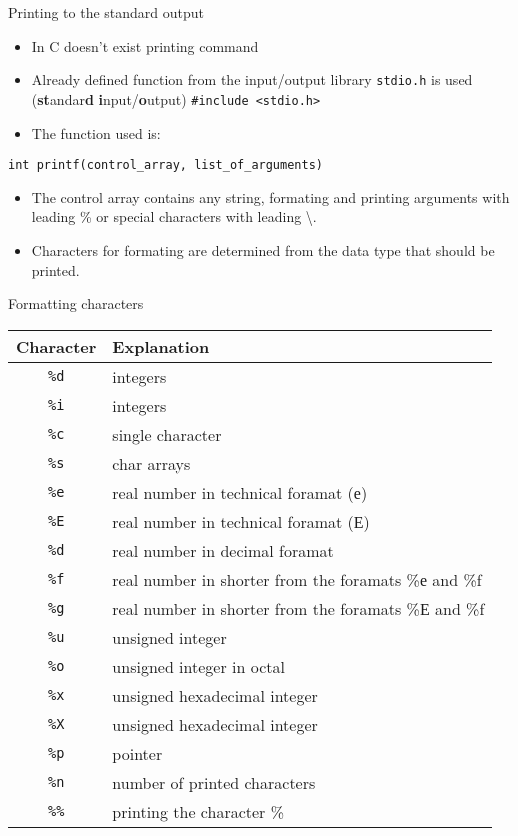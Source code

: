 \begin{frame}[fragile]{Printing to the standard output}
\begin{itemize}
\item In C doesn't exist printing command
\item Already defined function from the input/output library \texttt{stdio.h} is
used (\textbf{st}andar\textbf{d} \textbf{i}nput/\textbf{o}utput)
\large{\texttt{\#include <stdio.h>}}
\item The function used is:
\end{itemize}
\begin{verbatim}
int printf(control_array, list_of_arguments)
\end{verbatim}
\begin{itemize}
\item The control array contains any string, formating and printing arguments
with leading \% or special characters with leading \textbackslash.
\item Characters for formating are determined from the data type that
should be printed.
\end{itemize}
\end{frame}

\begin{frame}{Formatting characters}
\begin{scriptsize}
\begin{tabular}{|c|l|}
\hline \textbf{Character} & \textbf{Explanation} \\ 
\hline \texttt{\%d} & integers \\ 
\hline \texttt{\%i} & integers \\ 
\hline \texttt{\%c} & single character \\ 
\hline \texttt{\%s} & char arrays \\ 
\hline \texttt{\%e} & real number in technical foramat (е) \\
\hline \texttt{\%E} & real number in technical foramat (Е) \\ 
\hline \texttt{\%d} & real number in decimal foramat \\ 
\hline \texttt{\%f} & real number in shorter from the foramats \%е and \%f \\ 
\hline \texttt{\%g} & real number in shorter from the foramats \%Е and \%f \\  
\hline \texttt{\%u} & unsigned integer \\ 
\hline \texttt{\%o} & unsigned integer in octal \\ 
\hline \texttt{\%x} & unsigned hexadecimal integer \\
\hline \texttt{\%X} & unsigned hexadecimal integer \\ 
\hline \texttt{\%p} & pointer \\ 
\hline \texttt{\%n} & number of printed characters \\
\hline \texttt{\%\%} & printing the character \% \\ 
\hline 
\end{tabular} 
\end{scriptsize}
\end{frame}

